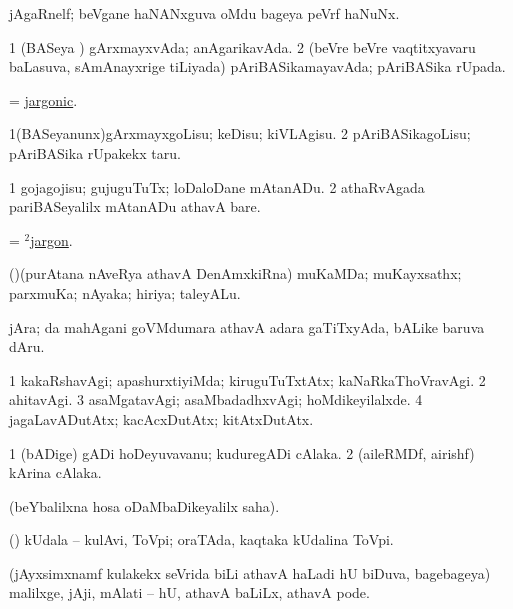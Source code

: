 \bentry
{}
\gl{\nA}
\bmng
jAgaRnelf; beVgane haNANxguva oMdu bageya peVrf haNuNx. 
\emng
\eentry

\bentry
{}
\gl{\gu}
\bmng
\bnum
\num{1} (BASeya \vi) gArxmayxvAda; anAgarikavAda. 
\num{2} (beVre beVre vaqtitxyavaru baLasuva, sAmAnayxrige tiLiyada) pAriBASikamayavAda; pAriBASika rUpada. 
\enum
\emng
\eentry

\bentry
{}
\gl{\gu}
\bmng
= \hyperlink{jargonic}{jargonic}. 
\emng
\eentry

\bentry
{}
\gl{\sakirx}
\bmng
\bnum
\num{1}(BASeyanunx)gArxmayxgoLisu; keDisu; kiVLAgisu. 
\num{2} pAriBASikagoLisu; pAriBASika rUpakekx taru. 
\enum
\emng

\noindent
\gl{\akirx}
\bmng
\bnum
\num{1} gojagojisu; gujuguTuTx; loDaloDane mAtanADu. 
\num{2} athaRvAgada pariBASeyalilx mAtanADu athavA bare. 
\enum
\emng
\eentry

\bentry
{}
\gl{\nA}
\bmng
=  \hyperlink{jargon(2)}{$^2$jargon}. 
\emng
\eentry

\bentry
{}
\gl{\nA}
\bmng
(\ca)(purAtana nAveRya athavA DenAmxkiRna) muKaMDa; muKayxsathx; parxmuKa; nAyaka; hiriya; taleyALu. 
\emng
\eentry

\bentry
{}
\gl{\nA}
\bmng
jAra; \AseTxrXV da mahAgani goVMdumara athavA adara gaTiTxyAda, bALike baruva dAru. 
\emng
\eentry

\bentry
{}
\gl{\kirxvi}
\bmng
\bnum
\num{1} kakaRshavAgi; apashurxtiyiMda; kiruguTuTxtAtx; kaNaRkaThoVravAgi. 
\num{2} ahitavAgi. 
\num{3} asaMgatavAgi; asaMbadadhxvAgi; hoMdikeyilalxde. 
\num{4} jagaLavADutAtx; kacAcxDutAtx; kitAtxDutAtx. 
\enum
\emng
\eentry

\bentry
{}
\gl{\nA}
\bmng
\bnum
\num{1} (bADige) gADi hoDeyuvavanu; kuduregADi cAlaka. 
\num{2} (aileRMDf, airishf) kArina cAlaka. 
\enum
\emng
\eentry

\bentry
{}
\gl{\saMkiSx}
\bmng
{}(beYbalilxna hosa oDaMbaDikeyalilx saha). 
\emng
\eentry

\bentry
{}
\gl{\nA}
\bmng
(\pArxparx) kUdala -- kulAvi, ToVpi; oraTAda, kaqtaka kUdalina ToVpi. 
\emng
\eentry

\bentry
{}
\gl{\nA}
\bmng
(jAyxsimxnamf kulakekx seVrida biLi athavA haLadi hU biDuva, bagebageya) malilxge, jAji, mAlati -- hU, athavA baLiLx, athavA pode. 
\emng

